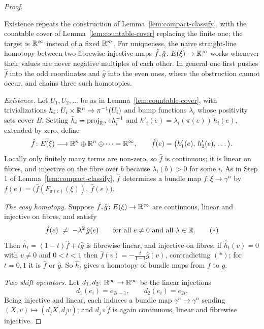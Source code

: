 \begin{proof}
\begin{strategy}
Existence repeats the construction of Lemma~\ref{lem:compact-classify}, with the
countable cover of Lemma~\ref{lem:countable-cover} replacing the finite one; the
target is $\mathbb{R}^\infty$ instead of a fixed $\mathbb{R}^m$. For uniqueness, the naive
straight-line homotopy between two fibrewise injective maps
$\hat f,\hat g\colon E(\xi)\to\mathbb{R}^\infty$ works whenever their values are never
negative multiples of each other. In general one first pushes $\hat f$ into the
odd coordinates and $\hat g$ into the even ones, where the obstruction cannot
occur, and chains three such homotopies.
\end{strategy}

 \emph{Existence.} Let $U_1,U_2,\dots$ be as in
Lemma~\ref{lem:countable-cover}, with trivializations
$h_i\colon U_i\times\mathbb{R}^n\to\pi^{-1}(U_i)$ and bump functions $\lambda_i$ whose
positivity sets cover $B$. Setting
$\tilde h_i=\operatorname{proj}_{\mathbb{R}^n}\circ h_i^{-1}$ and
$h'_i(e)=\lambda_i(\pi(e))\,\tilde h_i(e)$, extended by zero, define
\[
\hat f\colon E(\xi)\longrightarrow \mathbb{R}^n\oplus\mathbb{R}^n\oplus\cdots=\mathbb{R}^\infty,
\qquad
\hat f(e)=\big(h'_1(e),\,h'_2(e),\,\dots\big).
\]
Locally only finitely many terms are non-zero, so $\hat f$ is continuous; it is
linear on fibres, and injective on the fibre over $b$ because
$\lambda_i(b)>0$ for some $i$. As in Step 1 of
Lemma~\ref{lem:compact-classify}, $\hat f$ determines a bundle map
$f\colon\xi\to\gamma^n$ by
$f(e)=\big(\hat f(F_{\pi(e)}(\xi)),\ \hat f(e)\big)$.

 \emph{The easy homotopy.} Suppose $\hat f,\hat g\colon E(\xi)\to
\mathbb{R}^\infty$ are continuous, linear and injective on fibres, and satisfy
\[
\hat f(e)\ \neq\ -\lambda^2\,\hat g(e)
\qquad\text{for all }e\neq0\text{ and all }\lambda\in\mathbb{R} .
\tag{$\ast$}
\]
Then $\hat h_t=(1-t)\hat f+t\hat g$ is fibrewise linear, and injective on
fibres: if $\hat h_t(v)=0$ with $v\neq0$ and $0<t<1$ then
$\hat f(v)=-\tfrac{t}{1-t}\hat g(v)$, contradicting $(\ast)$; for $t=0,1$ it is
$\hat f$ or $\hat g$. So $\hat h_t$ gives a homotopy of bundle maps from $f$ to
$g$.

 \emph{Two shift operators.} Let $d_1,d_2\colon\mathbb{R}^\infty\to\mathbb{R}^\infty$ be
the linear injections
\[
d_1(e_i)=e_{2i-1},
\qquad
d_2(e_i)=e_{2i}.
\]
Being injective and linear, each induces a bundle map $\gamma^n\to\gamma^n$
sending $(X,v)\mapsto(d_jX,d_jv)$; and $d_j\circ\hat f$ is again continuous,
linear and fibrewise injective.


\end{proof}
